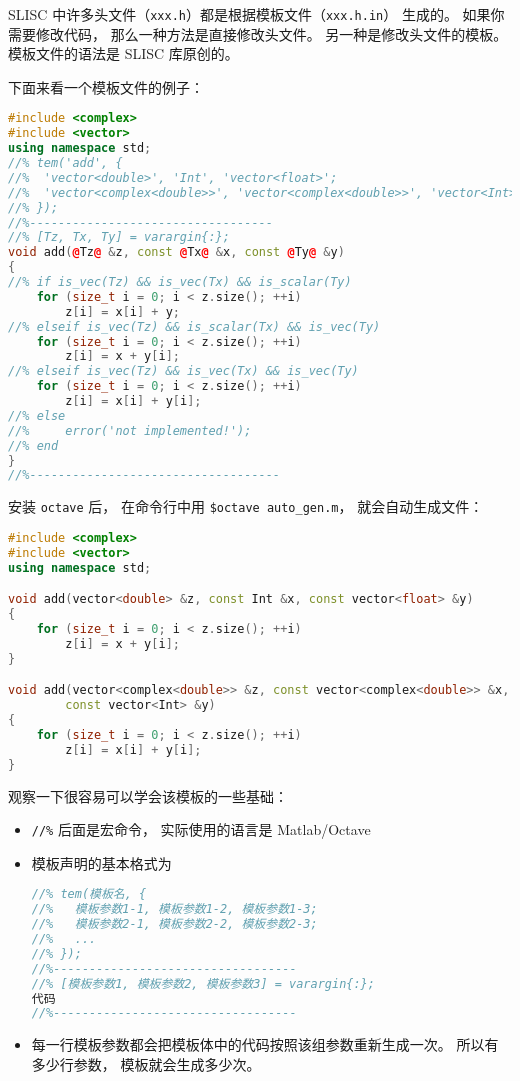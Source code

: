 
\begin{issues}
\issueDraft
\end{issues}


SLISC 中许多头文件（\verb|xxx.h|）都是根据模板文件（\verb|xxx.h.in|） 生成的。 如果你需要修改代码， 那么一种方法是直接修改头文件。 另一种是修改头文件的模板。 模板文件的语法是 SLISC 库原创的。

下面来看一个模板文件的例子：
\begin{lstlisting}[language=cpp, caption=demo.h.in]
#include <complex>
#include <vector>
using namespace std;
//% tem('add', {
//%  'vector<double>', 'Int', 'vector<float>';
//%  'vector<complex<double>>', 'vector<complex<double>>', 'vector<Int>';
//% });
//%----------------------------------
//% [Tz, Tx, Ty] = varargin{:};
void add(@Tz@ &z, const @Tx@ &x, const @Ty@ &y)
{
//% if is_vec(Tz) && is_vec(Tx) && is_scalar(Ty)
	for (size_t i = 0; i < z.size(); ++i)
		z[i] = x[i] + y;
//% elseif is_vec(Tz) && is_scalar(Tx) && is_vec(Ty)
	for (size_t i = 0; i < z.size(); ++i)
		z[i] = x + y[i];
//% elseif is_vec(Tz) && is_vec(Tx) && is_vec(Ty)
	for (size_t i = 0; i < z.size(); ++i)
		z[i] = x[i] + y[i];
//% else
//%     error('not implemented!');
//% end
}
//%-----------------------------------
\end{lstlisting}

安装 \verb|octave| 后， 在命令行中用 \verb`$octave auto_gen.m`， 就会自动生成文件：
\begin{lstlisting}[language=cpp,caption=demo.h]
#include <complex>
#include <vector>
using namespace std;

void add(vector<double> &z, const Int &x, const vector<float> &y)
{
	for (size_t i = 0; i < z.size(); ++i)
		z[i] = x + y[i];
}

void add(vector<complex<double>> &z, const vector<complex<double>> &x,
        const vector<Int> &y)
{
	for (size_t i = 0; i < z.size(); ++i)
		z[i] = x[i] + y[i];
}
\end{lstlisting}

观察一下很容易可以学会该模板的一些基础：
\begin{itemize}
\item \verb|//%| 后面是宏命令， 实际使用的语言是 Matlab/Octave
\item 模板声明的基本格式为
\begin{lstlisting}[language=cpp]
//% tem(模板名, {
//%   模板参数1-1, 模板参数1-2, 模板参数1-3;
//%   模板参数2-1, 模板参数2-2, 模板参数2-3;
//%   ...
//% });
//%----------------------------------
//% [模板参数1, 模板参数2, 模板参数3] = varargin{:};
代码
//%----------------------------------
\end{lstlisting}
\item 每一行模板参数都会把模板体中的代码按照该组参数重新生成一次。 所以有多少行参数， 模板就会生成多少次。
\end{itemize}
